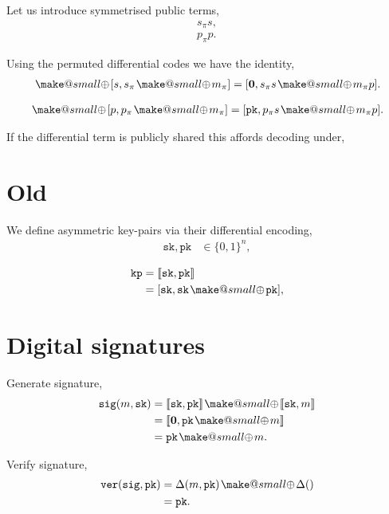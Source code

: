 \documentclass[twocolumn, aps, amsmath, amssymb, nofootinbib, superscriptaddress, longbibliography, doublefloatfix, table-of-contents, eqsecnum, rmp]{revtex4-2}
\makeatletter
\def\sk{\mathtt{sk}}
\def\pk{\mathtt{pk}}
\def\kp{\mathtt{kp}}
\def\sig{\mathtt{sig}}
\def\ver{\mathtt{ver}}
\def\diff#1#2{\llbracket #1,#2\rrbracket}
\newcommand{\soplus}{{{\hspace{1pt}}{\mathbin{\mathpalette\make@small{\mathbin\oplus}}}}{\hspace{1pt}}}
\newcommand{\make@small}[2]{%
  \vcenter{\hbox{%
    \scalebox{0.6}{$\m@th#1#2$}%
  }}%
}
\makeatother
\begin{document}
Let us introduce symmetrised public terms,
\begin{align}
	s_\pi s, \nonumber\\
	p_\pi p.	
\end{align}

Using the permuted differential codes we have the identity,
\begin{align}
	[s,s \soplus p] \soplus [s, s_\pi \soplus m_\pi] = [\mathbf{0}, s_\pi s \soplus m_\pi p].
\end{align}

\begin{align}
	[s,s \soplus p] \soplus [p,p_\pi \soplus m_\pi] = [\mathtt{pk}, p_\pi s \soplus m_\pi p].
\end{align}

If the differential term is publicly shared this affords decoding under,

\section{Old}

We define asymmetric key-pairs via their differential encoding,
\begin{align}
	\mathtt{sk}, \mathtt{pk} &\in \{0,1\}^n,
\end{align}

\begin{align}
	\kp &= \diff{\sk}{\pk} \nonumber\\
	&= [\sk,\sk \soplus \pk],
\end{align}

\section{Digital signatures}

Generate signature,
\begin{align}
	\sig(m,\sk) &= \diff{\sk}{\pk} \soplus \diff{\sk}{m} \nonumber\\
	&= \diff{\mathbf{0}}{\pk\soplus m} \nonumber\\
	&= \pk \soplus m.
\end{align}

Verify signature,
\begin{align}
	\ver(\sig,\pk) &= \Delta(m,\pk) \soplus \Delta() \nonumber\\
	&= \pk.
\end{align}
\end{document}
